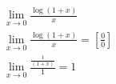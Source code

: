 \begin{ex}
\begin{align}
&\lim_{x\rightarrow 0} \frac{\log{(1+x)}}{x}\nonumber\\
&\lim_{x\rightarrow 0} \frac{\log{(1+x)}}{x} = \left[\frac{0}{0}\right]\nonumber\\
&\lim_{x\rightarrow 0}\frac{\frac{1}{(1+x)}}{1}=1\nonumber
\end{align}
\end{ex}
